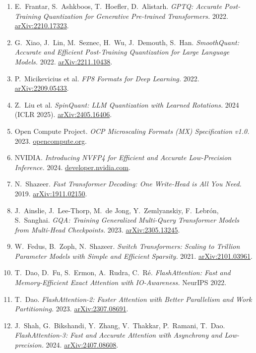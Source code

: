 \documentclass[11pt,a4paper]{article}
\theoremstyle{definition}
\theoremstyle{remark}
\theoremstyle{plain}
\newcommand{\arxivlink}[1]{\href{https://arxiv.org/abs/#1}{arXiv:#1}}
\begin{document}
\begin{enumerate}[leftmargin=1.8em, itemsep=3pt]
\item E.\ Frantar, S.\ Ashkboos, T.\ Hoefler, D.\ Alistarh. \textit{GPTQ: Accurate Post-Training Quantization for Generative Pre-trained Transformers.} 2022. \arxivlink{2210.17323}.
\item G.\ Xiao, J.\ Lin, M.\ Seznec, H.\ Wu, J.\ Demouth, S.\ Han. \textit{SmoothQuant: Accurate and Efficient Post-Training Quantization for Large Language Models.} 2022. \arxivlink{2211.10438}.
\item P.\ Micikevicius et al. \textit{FP8 Formats for Deep Learning.} 2022. \arxivlink{2209.05433}.
\item Z.\ Liu et al. \textit{SpinQuant: LLM Quantization with Learned Rotations.} 2024 (ICLR 2025). \arxivlink{2405.16406}.
\item Open Compute Project. \textit{OCP Microscaling Formats (MX) Specification v1.0.} 2023. \href{https://www.opencompute.org/documents/ocp-microscaling-formats-mx-v1-0-spec-final-pdf}{opencompute.org}.
\item NVIDIA. \textit{Introducing NVFP4 for Efficient and Accurate Low-Precision Inference.} 2024. \href{https://developer.nvidia.com/blog/introducing-nvfp4-for-efficient-and-accurate-low-precision-inference/}{developer.nvidia.com}.
\item N.\ Shazeer. \textit{Fast Transformer Decoding: One Write-Head is All You Need.} 2019. \arxivlink{1911.02150}.
\item J.\ Ainslie, J.\ Lee-Thorp, M.\ de Jong, Y.\ Zemlyanskiy, F.\ Lebr\'on, S.\ Sanghai. \textit{GQA: Training Generalized Multi-Query Transformer Models from Multi-Head Checkpoints.} 2023. \arxivlink{2305.13245}.
\item W.\ Fedus, B.\ Zoph, N.\ Shazeer. \textit{Switch Transformers: Scaling to Trillion Parameter Models with Simple and Efficient Sparsity.} 2021. \arxivlink{2101.03961}.
\item T.\ Dao, D.\ Fu, S.\ Ermon, A.\ Rudra, C.\ R\'e. \textit{FlashAttention: Fast and Memory-Efficient Exact Attention with IO-Awareness.} NeurIPS 2022.
\item T.\ Dao. \textit{FlashAttention-2: Faster Attention with Better Parallelism and Work Partitioning.} 2023. \arxivlink{2307.08691}.
\item J.\ Shah, G.\ Bikshandi, Y.\ Zhang, V.\ Thakkar, P.\ Ramani, T.\ Dao. \textit{FlashAttention-3: Fast and Accurate Attention with Asynchrony and Low-precision.} 2024. \arxivlink{2407.08608}.

\end{enumerate}
\end{document}
